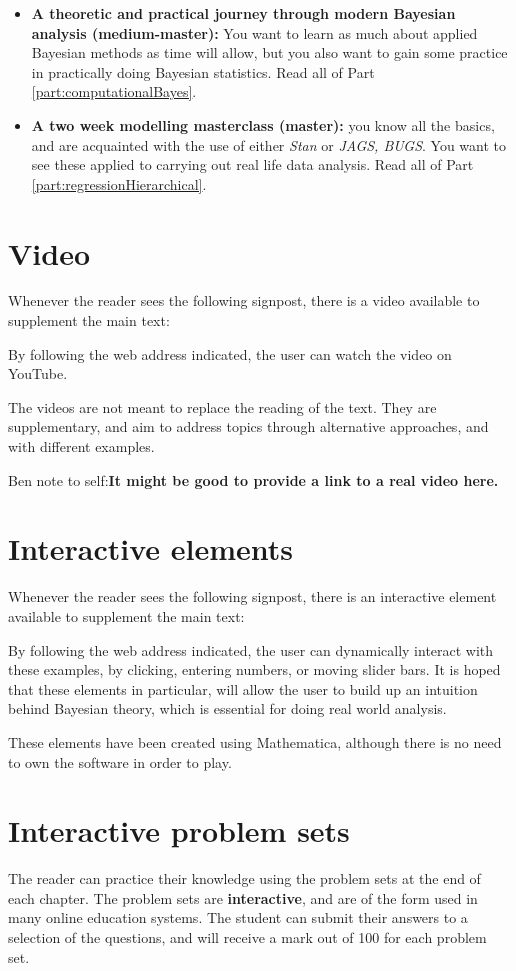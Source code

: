 \documentclass[11pt,fullpage]{book}
\begin{document}
\begin{itemize}
\item \textbf{A theoretic and practical journey through modern Bayesian analysis (medium-master):} You want to learn as much about applied Bayesian methods as time will allow, but you also want to gain some practice in practically doing Bayesian statistics. Read all of Part \ref{part:computationalBayes}.
\item \textbf{A two week modelling masterclass (master):} you know all the basics, and are acquainted with the use of either \textit{Stan} or \textit{JAGS, BUGS}. You want to see these applied to carrying out real life data analysis. Read all of Part \ref{part:regressionHierarchical}. 
\end{itemize}

\section{Video}
Whenever the reader sees the following signpost, there is a video available to supplement the main text:


By following the web address indicated, the user can watch the video on YouTube.

The videos are not meant to replace the reading of the text. They are supplementary, and aim to address topics through alternative approaches, and with different examples.

Ben note to self:\textbf{It might be good to provide a link to a real video here.}

\section{Interactive elements}
Whenever the reader sees the following signpost, there is an interactive element available to supplement the main text:


By following the web address indicated, the user can dynamically interact with these examples, by clicking, entering numbers, or moving slider bars. It is hoped that these elements in particular, will allow the user to build up an intuition behind Bayesian theory, which is essential for doing real world analysis.

These elements have been created using Mathematica, although there is no need to own the software in order to play. 

\section{Interactive problem sets}
The reader can practice their knowledge using the problem sets at the end of each chapter. The problem sets are \textbf{interactive}, and are of the form used in many online education systems. The student can submit their answers to a selection of the questions, and will receive a mark out of 100 for each problem set.
\end{document}

